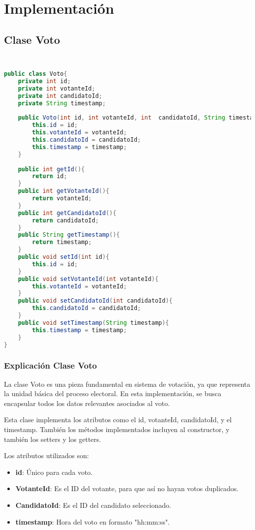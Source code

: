 \documentclass[12pt]{article}
\begin{document}
\pagebreak

\section{Implementación}
\subsection{Clase Voto }
\begin{verbatim}
    
\end{verbatim}
\begin{lstlisting}[language=Java,style=mystyle]    
public class Voto{
    private int id;
    private int votanteId;
    private int candidatoId;
    private String timestamp;
    
    public Voto(int id, int votanteId, int  candidatoId, String timestamp){
        this.id = id;
        this.votanteId = votanteId;
        this.candidatoId = candidatoId;
        this.timestamp = timestamp;
    }
    
    public int getId(){
        return id;
    }
    public int getVotanteId(){
        return votanteId;
    }
    public int getCandidatoId(){
        return candidatoId;
    }
    public String getTimestamp(){
        return timestamp;
    }
    public void setId(int id){
        this.id = id;
    }
    public void setVotanteId(int votanteId){
        this.votanteId = votanteId;
    }
    public void setCandidatoId(int candidatoId){
        this.candidatoId = candidatoId;
    }
    public void setTimestamp(String timestamp){
        this.timestamp = timestamp;
    }
}
\end{lstlisting}
\pagebreak
\subsubsection{Explicación Clase Voto}

La clase Voto es una pieza fundamental en sistema de votación, ya que representa la unidad básica del proceso electoral. En esta implementación, se busca encapsular todos los datos relevantes asociados al voto.

Esta clase implementa los atributos como el id, votanteId, candidatoId, y el timestamp. También los métodos implementados incluyen al constructor, y también los setters y los getters. 

Los atributos utilizados son:
\begin{itemize}
    \item \textbf{id}: Único para cada voto.
    \item \textbf{VotanteId}: Es el ID del votante, para que así no hayan votos 
        duplicados.
        \item \textbf{CandidatoId}: Es el ID del candidato seleccionado.
        \item \textbf{timestamp}: Hora del voto en formato "hh:mm:ss".
\end{itemize}
\end{document}
